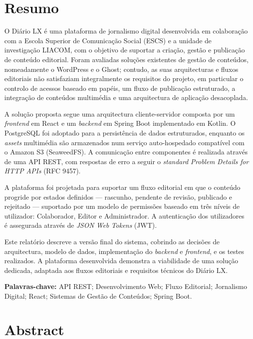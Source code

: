 \documentclass[a4paper,openany,twoside,11pt]{report}
\begin{document}
\cleardoublepage
\chapter*{Resumo}

O Diário LX é uma plataforma de jornalismo digital desenvolvida em colaboração com
a Escola Superior de Comunicação Social (ESCS) e a unidade de investigação LIACOM,
com o objetivo de suportar a criação, gestão e publicação de conteúdo editorial.
Foram avaliadas soluções existentes de gestão de conteúdos, nomeadamente o WordPress
e o Ghost; contudo, as suas arquitecturas e fluxos editoriais não satisfaziam
integralmente os requisitos do projeto, em particular o controlo de acessos baseado
em papéis, um fluxo de publicação estruturado, a integração de conteúdos multimédia
e uma arquitectura de aplicação desacoplada.

A solução proposta segue uma arquitectura cliente-servidor composta por um \textit{frontend}
em React e um \textit{backend} em Spring Boot implementado em Kotlin. O PostgreSQL foi adoptado
para a persistência de dados estruturados, enquanto os \textit{assets} multimédia são
armazenados num serviço auto-hospedado compatível com o Amazon S3 (SeaweedFS). A comunicação
entre componentes é realizada através de uma API REST, com respostas de erro a seguir
o \textit{standard Problem Details for HTTP APIs} (RFC 9457).

A plataforma foi projetada para suportar um fluxo editorial em que o conteúdo progride
por estados definidos — rascunho, pendente de revisão, publicado e rejeitado —
suportado por um modelo de permissões baseado em três níveis de utilizador:
Colaborador, Editor e Administrador. A autenticação dos utilizadores é assegurada
através de \textit{JSON Web Tokens} (JWT).

Este relatório descreve a versão final do sistema, cobrindo as decisões de
arquitectura, modelo de dados, implementação do \textit{backend} e \textit{frontend}, e os testes
realizados. A plataforma desenvolvida demonstra a viabilidade de uma
solução dedicada, adaptada aos fluxos editoriais e requisitos técnicos do Diário LX.

\vspace{5mm}
\textbf{Palavras-chave:} API REST; Desenvolvimento Web; Fluxo Editorial;
Jornalismo Digital; React; Sistemas de Gestão de Conteúdos; Spring Boot.

\cleardoublepage
\chapter*{Abstract}
\end{document}
